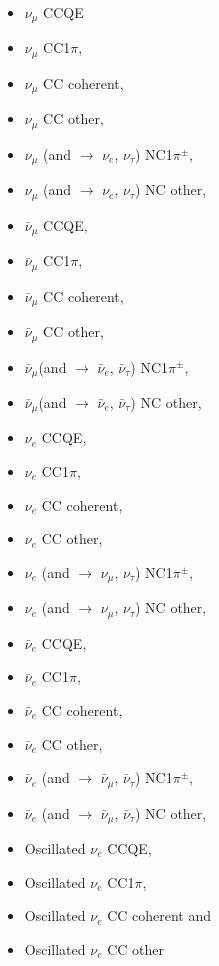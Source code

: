 \begin{itemize}
\item  $\nu_{\mu}$ CCQE
\item  $\nu_{\mu}$ CC1$\pi$, 
\item  $\nu_{\mu}$ CC coherent, 
\item  $\nu_{\mu}$ CC other, 
\item  $\nu_{\mu}$ (and $\rightarrow$ $\nu_{e}$, $\nu_{\tau}$) NC1$\pi^{\pm}$, 
\item  $\nu_{\mu}$ (and $\rightarrow$ $\nu_{e}$, $\nu_{\tau}$) NC other, 
\item  $\bar{\nu}_{\mu}$ CCQE, 
\item  $\bar{\nu}_{\mu}$ CC1$\pi$, 
\item  $\bar{\nu}_{\mu}$ CC coherent, 
\item  $\bar{\nu}_{\mu}$ CC other, 
\item  $\bar{\nu}_{\mu}$(and $\rightarrow$ $\bar{\nu}_{e}$, $\bar{\nu}_{\tau}$) NC1$\pi^{\pm}$, 
\item  $\bar{\nu}_{\mu}$(and $\rightarrow$ $\bar{\nu}_{e}$, $\bar{\nu}_{\tau}$) NC other, 
\item  $\nu_{e}$ CCQE, 
\item  $\nu_{e}$ CC1$\pi$,
\item  $\nu_{e}$ CC coherent,
\item  $\nu_{e}$ CC other,
\item  $\nu_{e}$ (and $\rightarrow$ $\nu_{\mu}$, $\nu_{\tau}$) NC1$\pi^{\pm}$,
\item  $\nu_{e}$ (and $\rightarrow$ $\nu_{\mu}$, $\nu_{\tau}$) NC other,
\item  $\bar{\nu}_{e}$ CCQE, 
\item  $\bar{\nu}_{e}$ CC1$\pi$,
\item  $\bar{\nu}_{e}$ CC coherent,
\item  $\bar{\nu}_{e}$ CC other,
\item  $\bar{\nu}_{e}$ (and $\rightarrow$ $\bar{\nu}_{\mu}$, $\bar{\nu}_{\tau}$) NC1$\pi^{\pm}$,
\item  $\bar{\nu}_{e}$ (and $\rightarrow$ $\bar{\nu}_{\mu}$, $\bar{\nu}_{\tau}$) NC other,
\item  Oscillated $\nu_{e}$ CCQE, 
\item  Oscillated $\nu_{e}$ CC1$\pi$,
\item  Oscillated $\nu_{e}$ CC coherent and
\item  Oscillated $\nu_{e}$ CC other
\end{itemize}

